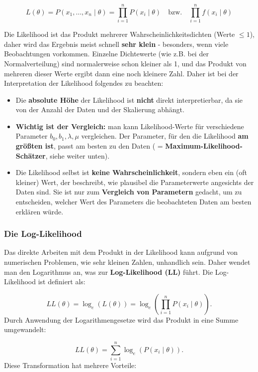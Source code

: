 \documentclass[
]{article}
\providecommand{\tightlist}{%
  \setlength{\itemsep}{0pt}\setlength{\parskip}{0pt}}
\begin{document}
\[L(\theta) = P(x_1, \dots, x_n \mid \theta)  = \prod_{i=1}^n P(x_i \mid \theta) \quad\text{bzw.}\quad    \prod_{i=1}^n f(x_i \mid \theta)\]

Die Likelihood ist das Produkt mehrerer Wahrscheinlichkeitsdichten (Werte \(\leq 1\)), daher wird das Ergebnis meist schnell \textbf{sehr klein} - besonders, wenn viele Beobachtungen vorkommen. Einzelne Dichtewerte (wie z.B. bei der Normalverteilung) sind normalerweise schon kleiner als 1, und das Produkt von mehreren dieser Werte ergibt dann eine noch kleinere Zahl. Daher ist bei der Interpretation der Likelihood folgendes zu beachten:

\begin{itemize}
\tightlist
\item
  Die \textbf{absolute Höhe} der Likelihood ist \textbf{nicht} direkt interpretierbar, da sie von der Anzahl der Daten und der Skalierung abhängt.
\item
  \textbf{Wichtig ist der Vergleich:} man kann Likelihood-Werte für verschiedene Parameter \(b_0, b_1, \lambda, \mu\) vergleichen. Der Parameter, für den die Likelihood \textbf{am größten ist}, passt am besten zu den Daten ( = \textbf{Maximum-Likelihood-Schätzer}, siehe weiter unten).
\item
  Die Likelihood selbst ist \textbf{keine Wahrscheinlichkeit}, sondern eben ein (oft kleiner) Wert, der beschreibt, wie plausibel die Parameterwerte angesichts der Daten sind. Sie ist nur zum \textbf{Vergleich von Parametern} gedacht, um zu entscheiden, welcher Wert des Parameters die beobachteten Daten am besten erklären würde.
\end{itemize}

\subsubsection{Die Log-Likelihood}\label{die-log-likelihood}

Das direkte Arbeiten mit dem Produkt in der Likelihood kann aufgrund von numerischen Problemen, wie sehr kleinen Zahlen, unhandlich sein. Daher wendet man den Logarithmus an, was zur \textbf{Log-Likelihood (LL)} führt. Die Log-Likelihood ist definiert als:

\[LL(\theta) = \log_e \left( L(\theta) \right) = \log_e \left( \prod_{i=1}^{n} P(x_i \mid \theta) \right).\]
Durch Anwendung der Logarithmengesetze wird das Produkt in eine Summe umgewandelt:

\[LL(\theta) = \sum_{i=1}^{n} \log_e \left( P(x_i \mid \theta) \right).\]
Diese Transformation hat mehrere Vorteile:
\end{document}
